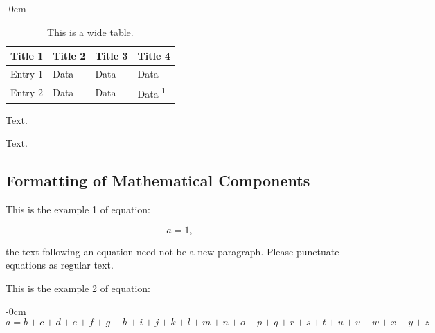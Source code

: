 \documentclass[energies,article,submit,pdftex,moreauthors]{Definitions/mdpi}
\begin{document}
\begin{table}[H]
\caption{This is a wide table.\label{tab2}}
	\begin{adjustwidth}{-\extralength}{0cm}
		\begin{tabularx}{\fulllength}{CCCC}
			\toprule
			\textbf{Title 1}	& \textbf{Title 2}	& \textbf{Title 3}     & \textbf{Title 4}\\
			\midrule
			Entry 1		& Data			& Data			& Data\\
			Entry 2		& Data			& Data			& Data \textsuperscript{1}\\
			\bottomrule
		\end{tabularx}
	\end{adjustwidth}
\end{table}


Text.

Text.

\subsection{Formatting of Mathematical Components}

This is the example 1 of equation:
\begin{linenomath}
\begin{equation}
a = 1,
\end{equation}
\end{linenomath}
the text following an equation need not be a new paragraph. Please punctuate equations as regular text.

This is the example 2 of equation:
\begin{adjustwidth}{-\extralength}{0cm}
\begin{equation}
a = b + c + d + e + f + g + h + i + j + k + l + m + n + o + p + q + r + s + t + u + v + w + x + y + z
\end{equation}
\end{adjustwidth}
\end{document}
